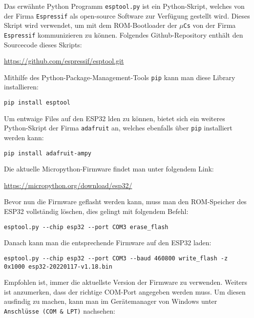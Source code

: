 \documentclass[paper=a4,12pt]{scrreprt}
\begin{document}
Das erwähnte Python Programm \texttt{esptool.py} ist ein Python-Skript, welches von der Firma \texttt{Espressif} als open-source Software zur Verfügung gestellt wird. Dieses Skript wird verwendet, um mit dem ROM-Bootloader der \texttt{$\mu$Cs} von der Firma \texttt{Espressif} kommunizieren zu können. Folgendes Github-Repository enthält den Sourcecode dieses Skripts:\newline

\url{https://github.com/espressif/esptool.git}\newline

Mithilfe des Python-Package-Management-Tools \texttt{pip} kann man diese Library installieren:\newline

\begin{lstlisting}
pip install esptool
\end{lstlisting}

Um entwaige Files auf den ESP32 lden zu können, bietet sich ein weiteres Python-Skript der Firma \texttt{adafruit} an, welches ebenfalls über \texttt{pip} installiert werden kann:\newline

\begin{lstlisting}
pip install adafruit-ampy
\end{lstlisting}

Die aktuelle Micropython-Firmware findet man unter folgendem Link:\newline

\url{https://micropython.org/download/esp32/}\newline

Bevor nun die Firmware geflasht werden kann, muss man den ROM-Speicher des ESP32 vollständig löschen, dies gelingt mit folgendem Befehl:\newline

\begin{lstlisting}
esptool.py --chip esp32 --port COM3 erase_flash
\end{lstlisting}

Danach kann man die entsprechende Firmware auf den ESP32 laden:\newline

\begin{lstlisting}
esptool.py --chip esp32 --port COM3 --baud 460800 write_flash -z 0x1000 esp32-20220117-v1.18.bin
\end{lstlisting}

Empfohlen ist, immer die aktuellste Version der Firmware zu verwenden. Weiters ist anzumerken, dass der richtige COM-Port angegeben werden muss. Um diesen ausfindig zu machen, kann man im Gerätemanager von Windows unter \texttt{Anschlüsse (COM \& LPT)} nachsehen:\newline
\end{document}

